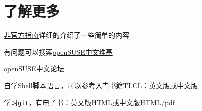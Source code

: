 \documentclass[11pt,openany]{book}
\newcommand{\soft}[1]{\texttt{\textcolor{dgreen}{#1}}}
\begin{document}
\chapter{了解更多}
\begin{compactitem}
 \item \href{https://lug.ustc.edu.cn/sites/opensuse-guide/}{非官方指南}详细的介绍了一些简单的内容
 \item 有问题可以搜索\href{https://zh.opensuse.org/%E9%A6%96%E9%A1%B5}{openSUSE中文维基}
 \item \href{https://forum.suse.org.cn/}{openSUSE中文论坛}
 \item 自学Shell脚本语言，可以参考入门书籍TLCL：\href{http://home.ustc.edu.cn/~zpj/doc/Linux/The_Linux_Command_Line.pdf}{英文版}或\href{http://home.ustc.edu.cn/~zpj/doc/Linux/The_Linux_Command_Line(%e4%b8%ad%e6%96%87%e7%89%88).pdf}{中文版}
 \item 学习\soft{git}，有电子书：\href{http://git-scm.com/book/}{英文版HTML}或中文版\href{http://git-scm.com/book/zh}{HTML}/\href{http://liam0205.me/attachment/Git/progit.zh.pdf}{pdf}
\end{compactitem}
\listoffigures
\end{document}
